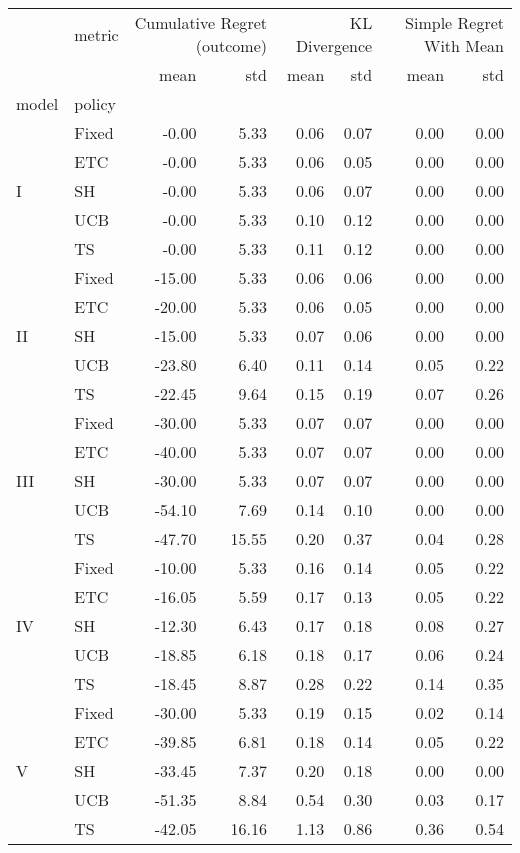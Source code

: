 \begin{tabular}{llrrrrrr}
 & metric & \multicolumn{2}{r}{Cumulative Regret (outcome)} & \multicolumn{2}{r}{KL Divergence} & \multicolumn{2}{r}{Simple Regret With Mean} \\
 &  & mean & std & mean & std & mean & std \\
model & policy &  &  &  &  &  &  \\
\multirow[c]{5}{*}{I} & Fixed & -0.00 & 5.33 & 0.06 & 0.07 & 0.00 & 0.00 \\
 & ETC & -0.00 & 5.33 & 0.06 & 0.05 & 0.00 & 0.00 \\
 & SH & -0.00 & 5.33 & 0.06 & 0.07 & 0.00 & 0.00 \\
 & UCB & -0.00 & 5.33 & 0.10 & 0.12 & 0.00 & 0.00 \\
 & TS & -0.00 & 5.33 & 0.11 & 0.12 & 0.00 & 0.00 \\
\multirow[c]{5}{*}{II} & Fixed & -15.00 & 5.33 & 0.06 & 0.06 & 0.00 & 0.00 \\
 & ETC & -20.00 & 5.33 & 0.06 & 0.05 & 0.00 & 0.00 \\
 & SH & -15.00 & 5.33 & 0.07 & 0.06 & 0.00 & 0.00 \\
 & UCB & -23.80 & 6.40 & 0.11 & 0.14 & 0.05 & 0.22 \\
 & TS & -22.45 & 9.64 & 0.15 & 0.19 & 0.07 & 0.26 \\
\multirow[c]{5}{*}{III} & Fixed & -30.00 & 5.33 & 0.07 & 0.07 & 0.00 & 0.00 \\
 & ETC & -40.00 & 5.33 & 0.07 & 0.07 & 0.00 & 0.00 \\
 & SH & -30.00 & 5.33 & 0.07 & 0.07 & 0.00 & 0.00 \\
 & UCB & -54.10 & 7.69 & 0.14 & 0.10 & 0.00 & 0.00 \\
 & TS & -47.70 & 15.55 & 0.20 & 0.37 & 0.04 & 0.28 \\
\multirow[c]{5}{*}{IV} & Fixed & -10.00 & 5.33 & 0.16 & 0.14 & 0.05 & 0.22 \\
 & ETC & -16.05 & 5.59 & 0.17 & 0.13 & 0.05 & 0.22 \\
 & SH & -12.30 & 6.43 & 0.17 & 0.18 & 0.08 & 0.27 \\
 & UCB & -18.85 & 6.18 & 0.18 & 0.17 & 0.06 & 0.24 \\
 & TS & -18.45 & 8.87 & 0.28 & 0.22 & 0.14 & 0.35 \\
\multirow[c]{5}{*}{V} & Fixed & -30.00 & 5.33 & 0.19 & 0.15 & 0.02 & 0.14 \\
 & ETC & -39.85 & 6.81 & 0.18 & 0.14 & 0.05 & 0.22 \\
 & SH & -33.45 & 7.37 & 0.20 & 0.18 & 0.00 & 0.00 \\
 & UCB & -51.35 & 8.84 & 0.54 & 0.30 & 0.03 & 0.17 \\
 & TS & -42.05 & 16.16 & 1.13 & 0.86 & 0.36 & 0.54 \\
\end{tabular}

